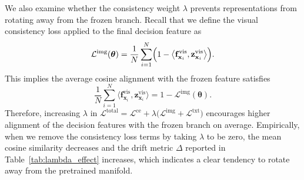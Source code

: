\documentclass{article}
\theoremstyle{plain}
\theoremstyle{definition}
\theoremstyle{remark}
\begin{document}
	We also examine whether the consistency weight $\lambda$ prevents representations from rotating away from the frozen branch.
	Recall that we define the visual consistency loss applied to the final decision feature as
	\begin{equation*}
		\mathcal L^{\mathrm{img}}(\boldsymbol{\theta})
		=
		\frac{1}{N}\sum_{i=1}^{N}\Bigl(1-\bigl\langle \mathbf{f}^{\mathrm{vis}}_{\mathbf{x}_i},\mathbf{z}^{\mathrm{vis}}_{\mathbf{x}_i}\bigr\rangle\Bigr).
	\end{equation*}
	This implies the average cosine alignment with the frozen feature satisfies
	\begin{equation*}
		\frac{1}{N}\sum_{i=1}^{N}\bigl\langle \mathbf{f}^{\mathrm{vis}}_{\mathbf{x}_i},\mathbf{z}^{\mathrm{vis}}_{\mathbf{x}_i}\bigr\rangle
		=
		1-\mathcal L^{\mathrm{img}}(\boldsymbol{\theta}).
	\end{equation*}
	Therefore, increasing $\lambda$ in $\mathcal L^{\mathrm{total}}=\mathcal L^{\mathrm{ce}}+\lambda\bigl(\mathcal L^{\mathrm{img}}+\mathcal L^{\mathrm{txt}}\bigr)$
	encourages higher alignment of the decision features with the frozen branch on average.
	Empirically, when we remove the consistency loss terms by taking $\lambda$ to be zero, the mean cosine similarity decreases and the drift metric $\Delta$ reported in Table~\ref{tab:lambda_effect} increases, which indicates a clear tendency to rotate away from the pretrained manifold.
\end{document}
